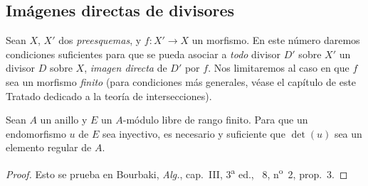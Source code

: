 \subsection{Imágenes directas de divisores}
\label{subsection:IV.21.5}
\label{IV.21.5}

\begin{env}[21.5.1]
\label{IV.21.5.1}
Sean $X$, $X'$ dos \emph{preesquemas}, y $f:X'\to X$ un morfismo.
En este número daremos condiciones suficientes para que se pueda asociar a \emph{todo} divisor $D'$ sobre $X'$ un divisor $D$ sobre $X$, \emph{imagen directa} de $D'$ por $f$.
Nos limitaremos al caso en que $f$ sea un morfismo \emph{finito} (para condiciones más generales, véase el capítulo de este Tratado dedicado a la teoría de intersecciones).
\end{env}

\begin{lemma}[21.5.2]
\label{IV.21.5.2}
Sean $A$ un anillo y $E$ un $A$-módulo libre de rango finito.
Para que un endomorfismo $u$ de $E$ sea inyectivo, es necesario y suficiente que $\det(u)$ sea un elemento regular de $A$.
\end{lemma}

\begin{proof}
Esto se prueba en Bourbaki, \emph{Alg.}, cap.~III, 3\textsuperscript{a} ed., \textsection~8, n\textsuperscript{o}~2, prop.~3.
\end{proof}

